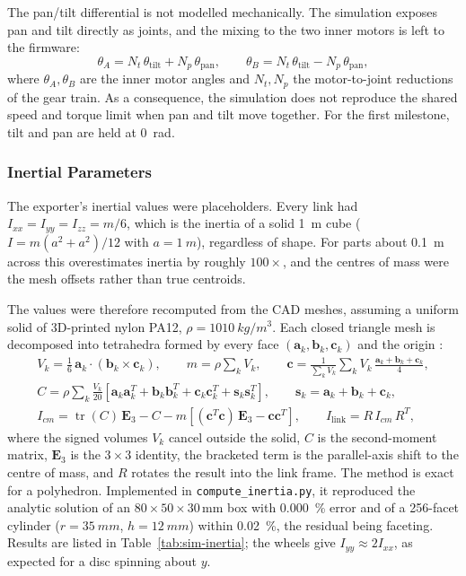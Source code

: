 \documentclass[12pt,a4paper]{article}
\begin{document}
The pan/tilt differential is not modelled mechanically. The simulation exposes pan and tilt directly as joints, and the mixing to the two inner motors is left to the firmware:
\begin{equation}
	\theta_A = N_t\,\theta_{\text{tilt}} + N_p\,\theta_{\text{pan}}, \qquad
	\theta_B = N_t\,\theta_{\text{tilt}} - N_p\,\theta_{\text{pan}},
\end{equation}
where $\theta_A, \theta_B$ are the inner motor angles and $N_t, N_p$ the motor-to-joint reductions of the gear train. As a consequence, the simulation does not reproduce the shared speed and torque limit when pan and tilt move together. For the first milestone, tilt and pan are held at \SI{0}{rad}.

\subsubsection{Inertial Parameters}

The exporter's inertial values were placeholders. Every link had $I_{xx} = I_{yy} = I_{zz} = m/6$, which is the inertia of a solid \SI{1}{m} cube ($I = m(a^2 + a^2)/12$ with $a = \SI{1}{m}$), regardless of shape. For parts about \SI{0.1}{m} across this overestimates inertia by roughly $100\times$, and the centres of mass were the mesh offsets rather than true centroids.

The values were therefore recomputed from the CAD meshes, assuming a uniform solid of 3D-printed nylon PA12, $\rho = \SI{1010}{kg/m^3}$. Each closed triangle mesh is decomposed into tetrahedra formed by every face $(\mathbf{a}_k, \mathbf{b}_k, \mathbf{c}_k)$ and the origin \cite{mirtich1996}:
\begin{gather}
	V_k = \tfrac{1}{6}\,\mathbf{a}_k \cdot (\mathbf{b}_k \times \mathbf{c}_k), \qquad
	m = \rho \sum_k V_k, \qquad
	\mathbf{c} = \frac{1}{\sum_k V_k} \sum_k V_k\,\frac{\mathbf{a}_k + \mathbf{b}_k + \mathbf{c}_k}{4}, \\
	C = \rho \sum_k \frac{V_k}{20} \left[ \mathbf{a}_k\mathbf{a}_k^{T} + \mathbf{b}_k\mathbf{b}_k^{T} + \mathbf{c}_k\mathbf{c}_k^{T} + \mathbf{s}_k\mathbf{s}_k^{T} \right],
	\qquad \mathbf{s}_k = \mathbf{a}_k + \mathbf{b}_k + \mathbf{c}_k, \\
	I_{cm} = \operatorname{tr}(C)\,\mathbf{E}_3 - C - m\left[ (\mathbf{c}^{T}\mathbf{c})\,\mathbf{E}_3 - \mathbf{c}\mathbf{c}^{T} \right], \qquad
	I_{\text{link}} = R\,I_{cm}\,R^{T},
\end{gather}
where the signed volumes $V_k$ cancel outside the solid, $C$ is the second-moment matrix, $\mathbf{E}_3$ is the $3 \times 3$ identity, the bracketed term is the parallel-axis shift to the centre of mass, and $R$ rotates the result into the link frame. The method is exact for a polyhedron. Implemented in \texttt{compute\_inertia.py}, it reproduced the analytic solution of an $80 \times 50 \times 30$\,mm box with \SI{0.000}{\percent} error and of a 256-facet cylinder ($r = \SI{35}{mm}$, $h = \SI{12}{mm}$) within \SI{0.02}{\percent}, the residual being faceting. Results are listed in Table~\ref{tab:sim-inertia}; the wheels give $I_{yy} \approx 2 I_{xx}$, as expected for a disc spinning about $y$.
\end{document}
